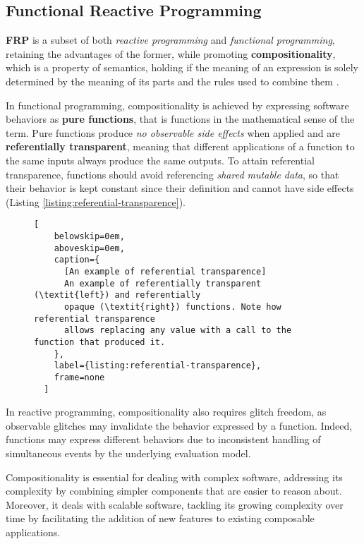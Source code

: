 
\subsection{Functional Reactive Programming}
\label{section:background:concepts:frp}

\textbf{\ac{FRP}} is a subset of both \textit{reactive programming} and
\textit{functional programming}, retaining the advantages of the former,
while promoting \textbf{compositionality}, which is a property of semantics,
holding if the meaning of an expression is solely determined by the meaning of
its parts and the rules used to combine them \cite{FRP}.

In functional programming, compositionality is achieved by expressing software
behaviors as \textbf{pure functions}, that is functions in the mathematical
sense of the term. Pure functions produce \textit{no observable side effects}
when applied and are \textbf{referentially transparent}, meaning that different
applications of a function to the same inputs always produce the same outputs.
To attain referential transparence, functions should avoid referencing
\textit{shared mutable data}, so that their behavior is kept constant since
their definition and cannot have side effects (Listing
\ref{listing:referential-transparence}).

\begin{figure}[!ht]
  \noindent
  \begin{minipage}{0.49\textwidth}
    
  \end{minipage}
  \hfill
  \begin{minipage}{0.49\textwidth}
    
  \end{minipage}
  \begin{lstlisting}[
    belowskip=0em,
    aboveskip=0em,
    caption={
      [An example of referential transparence]
      An example of referentially transparent (\textit{left}) and referentially
      opaque (\textit{right}) functions. Note how referential transparence
      allows replacing any value with a call to the function that produced it.
    },
    label={listing:referential-transparence},
    frame=none
  ]
\end{lstlisting}
\end{figure}

In reactive programming, compositionality also requires glitch freedom, as
observable glitches may invalidate the behavior expressed by a function.
Indeed, functions may express different behaviors due to inconsistent handling
of simultaneous events by the underlying evaluation model.

Compositionality is essential for dealing with complex software, addressing its
complexity by combining simpler components that are easier to reason about.
Moreover, it deals with scalable software, tackling its growing complexity over
time by facilitating the addition of new features to existing composable
applications.
